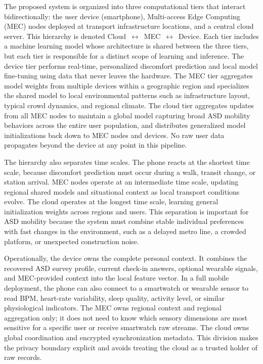 \documentclass[lettersize,journal]{IEEEtran}
\begin{document}
The proposed system is organized into three computational tiers that
interact bidirectionally: the user device (smartphone), Multi-access
Edge Computing (MEC) nodes deployed at transport infrastructure
locations, and a central cloud server. This hierarchy is denoted
Cloud~$\leftrightarrow$~MEC~$\leftrightarrow$~Device. Each tier includes
a machine learning model whose architecture is shared between the three
tiers, but each tier is responsible for a distinct scope of learning and
inference.
The device tier performs real-time, personalized discomfort prediction and local
model fine-tuning using data that never leaves the hardware. The MEC
tier aggregates model weights from multiple devices within a geographic
region and specializes the shared model to local environmental patterns
such as infrastructure layout, typical crowd dynamics, and regional
climate. The cloud tier aggregates updates from all MEC nodes to
maintain a global model capturing broad ASD mobility behaviors across
the entire user population, and distributes generalized model
initializations back down to MEC nodes and devices. No raw user data
propagates beyond the device at any point in this pipeline.

The hierarchy also separates time scales. The phone reacts at the
shortest time scale, because discomfort prediction must occur during a
walk, transit change, or station arrival. MEC nodes operate at an
intermediate time scale, updating regional shared models and situational
context as local transport conditions evolve. The cloud operates at the
longest time scale, learning general initialization weights across
regions and users. This separation is important for ASD mobility because
the system must combine stable individual preferences with fast changes
in the environment, such as a delayed metro line, a crowded platform, or
unexpected construction noise.

Operationally, the device owns the complete personal context. It
combines the recovered ASD survey profile, current check-in answers,
optional wearable signals, and MEC-provided context into the local
feature vector. In a full mobile deployment, the phone can also connect
to a smartwatch or wearable sensor to read BPM, heart-rate variability,
sleep quality, activity level, or similar physiological indicators. The
MEC owns regional context and regional aggregation only; it does not
need to know which sensory dimensions are most sensitive for a specific
user or receive smartwatch raw streams. The cloud owns global
coordination and encrypted synchronization metadata. This division makes
the privacy boundary explicit and avoids treating the cloud as a trusted
holder of raw records.
\end{document}

